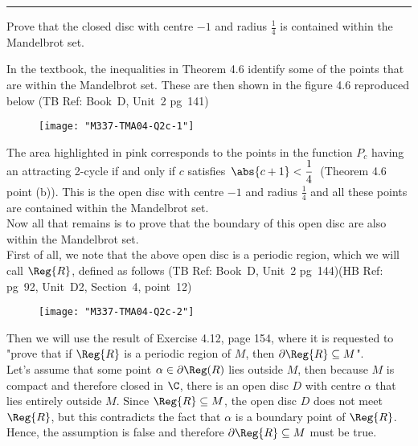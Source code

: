 \documentclass[english,a4paper,11pt]{scrartcl}
\begin{document}
\comment{===========================================================}
\noindent\rule[0.5ex]{\linewidth}{1pt} 
\newpage
\begin{Question}{}

 Prove that the closed disc with centre $-1$ and radius $\displaystyle \frac1{4}$ is contained within the Mandelbrot set.

\bigskip
\end{Question}

\setcounter{equation}{0}

\bigskip

In the textbook, the inequalities in Theorem 4.6 identify some of the points that are within the Mandelbrot set. These are then shown in the figure 4.6 reproduced below (TB Ref: Book~D, Unit~2 pg~141) \\

\begin{figure}[H]
	\centering
	\texttt{[image: "M337-TMA04-Q2c-1"]}
\end{figure}

The area highlighted in pink corresponds to the points in the function $P_c$ having an attracting 2-cycle if and only if $c$ satisfies \,$\abs{c+1} < \displaystyle \frac1{4}$\, (Theorem 4.6 point (b)). This is the open disc with centre $-1$ and radius $\displaystyle \frac1{4}$ and all these points are contained within the Mandelbrot set.\\

\bigskip
Now all that remains is to prove that the boundary of this open disc are also within the Mandelbrot set. \\

\bigskip
First of all, we note that the above open disc is a periodic region, which we will call $\Reg{R}$, defined as follows (TB Ref: Book~D, Unit~2 pg~144)(HB Ref: pg~92, Unit~D2, Section~4, point~12) \\

\begin{figure}[H]
	\centering
	\texttt{[image: "M337-TMA04-Q2c-2"]}
\end{figure}

Then we will use the result of Exercise 4.12, page 154, where it is requested to "prove that if $\Reg{R}$ is a periodic region of $M$, then $\partial\Reg{R} \subseteq M$". \\

\bigskip
Let's assume that some point $\alpha \in \partial\Reg(R)$ lies outside $M$, then because $M$ is compact and therefore closed in $\C$, there is an open disc $D$ with centre $\alpha$ that lies entirely outside $M$. Since $\Reg{R} \subseteq M$, the open disc $D$ does not meet $\Reg{R}$, but this contradicts the fact that $\alpha$ is a boundary point of $\Reg{R}$. Hence, the assumption is false and therefore $\partial\Reg{R} \subseteq M$ must be true.\\
\end{document}
